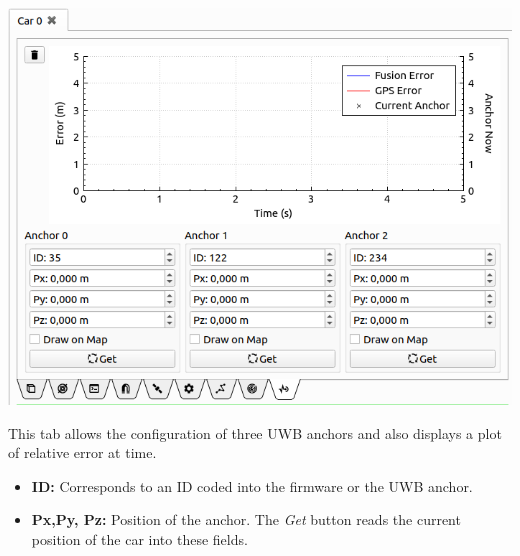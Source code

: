 \documentclass[12pt]{article} %
\newcommand{\todo}[1]{{\color{red} \textbf{TODO:} #1}}
\begin{document}
\noindent\begin{minipage}{0.5\textwidth}
  \noindent \includegraphics[width=\textwidth]{./screens/Car_UWB.png}
\end{minipage}
\begin{minipage}{0.5\textwidth} %
  This tab allows the configuration of three UWB anchors and also displays a plot
  of relative error at time.
  \begin{itemize}
  \item {\bf ID:} Corresponds to an ID coded into the firmware or the UWB anchor.
  \item {\bf Px,Py, Pz:} Position of the anchor. The {\em Get} button
    reads the current position of the car into these fields. 
  \end{itemize} 
\end{minipage}



\end{document}
